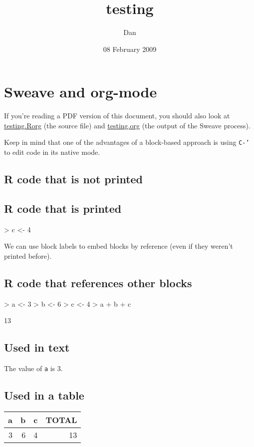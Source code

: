 \documentclass[11pt]{article}
\title{testing}
\author{Dan}
\date{08 February 2009}
\begin{document}
\maketitle

\setcounter{tocdepth}{3}
\tableofcontents
\vspace*{1cm}

\section{Sweave and org-mode}
\label{sec-1}

  If you're reading a PDF version of this document, you should also
  look at \href{file:///home/dan/src/rorg/existing_tools/RweaveOrg/testing.Rorg}{testing.Rorg} (the source file) and \href{file:///home/dan/src/rorg/existing_tools/RweaveOrg/testing.org}{testing.org} (the output
  of the Sweave process).

  Keep in mind that one of the advantages of a block-based approach is
  using \texttt{C-'} to edit code in its native mode.

\subsection{R code that is not printed}
\label{sec-1.3}


\subsection{R code that is printed}
\label{sec-1.4}

\begin{Schunk}
\begin{Sinput}
> c <- 4
\end{Sinput}
\end{Schunk}
   
   We can use block labels to embed blocks by reference (even if they
   weren't printed before).
\subsection{R code that references other blocks}
\label{sec-1.5}

\begin{Schunk}
\begin{Sinput}
> a <- 3
> b <- 6
> c <- 4
> a + b + c
\end{Sinput}
\begin{Soutput}
[1] 13
\end{Soutput}
\end{Schunk}

\subsection{Used in text}
\label{sec-1.7}

    The value of \verb=a= is 3.

\subsection{Used in a table}
\label{sec-1.8}


\begin{center}
\begin{tabular}{rrrr}
 a  &  b  &  c  &  TOTAL  \\
\hline
 3  &  6  &  4  &     13  \\
\end{tabular}
\end{center}
\end{document}
